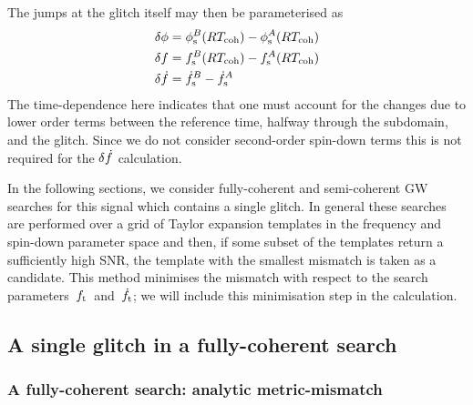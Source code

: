 \documentclass[../full_thesis/full_thesis.tex]{subfiles}
\begin{document}
The jumps at the glitch itself may then be parameterised as
\begin{align}
\begin{split}
\delta\phi & =  \phi_{\textrm{s}}^{B}(RT_{\mathrm{coh}}) - \phi_{\textrm{s}}^{A}(RT_{\mathrm{coh}})\\
\delta f & =  f_{\textrm{s}}^{B}(RT_{\mathrm{coh}}) - f_{\textrm{s}}^{A}(RT_{\mathrm{coh}})\\
\delta\dot{f} & =  \dot{f}_{\textrm{s}}^{B} - \dot{f}_{\textrm{s}}^{A}
\end{split}
\label{eqn: glitch jumps}
\end{align}
The time-dependence here indicates that one must account for the
changes due to lower order terms between the reference time, halfway through
the subdomain, and the glitch. Since we do not consider second-order spin-down
terms this is not required for the $\delta\dot{f}$ calculation.

In the following sections, we consider fully-coherent and semi-coherent GW
searches for this signal which contains a single glitch. In general these
searches are performed over a grid of Taylor expansion templates in the
frequency and spin-down parameter space and then, if some subset of the
templates return a sufficiently high SNR, the template with the smallest
mismatch is taken as a candidate. This method minimises the mismatch with
respect to the search parameters~${f_{\textrm{t}}}$~and~$\dot{f}_{\textrm{t}}$; we will include this
minimisation step in the calculation.

\subsection{A single glitch in a fully-coherent search}

\subsubsection{A fully-coherent search: analytic metric-mismatch}
\end{document}
